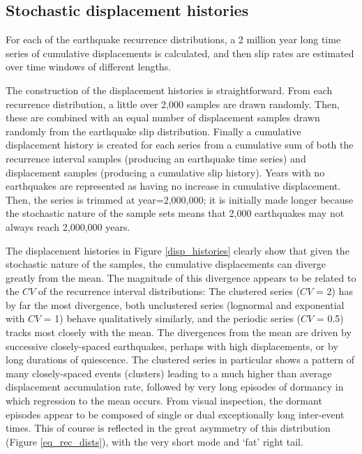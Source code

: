 \documentclass[se, manuscript]{copernicus}
\begin{document}
\subsection{Stochastic displacement
histories}\label{stochastic-displacement-histories}

For each of the earthquake recurrence distributions, a 2 million year
long time series of cumulative displacements is calculated, and then
slip rates are estimated over time windows of different lengths.

The construction of the displacement histories is straightforward. From
each recurrence distribution, a little over 2,000 samples are drawn
randomly. Then, these are combined with an equal number of displacement
samples drawn randomly from the earthquake slip distribution. Finally a
cumulative displacement history is created for each series from a
cumulative sum of both the recurrence interval samples (producing an
earthquake time series) and displacement samples (producing a cumulative
slip history). Years with no earthquakes are represented as having no
increase in cumulative displacement. Then, the series is trimmed at
year=2,000,000; it is initially made longer because the stochastic
nature of the sample sets means that 2,000 earthquakes may not always
reach 2,000,000 years.

The displacement histories in Figure \ref{disp_histories} clearly show
that given the stochastic nature of the samples, the cumulative
displacements can diverge greatly from the mean. The magnitude of this
divergence appears to be related to the \(CV\) of the recurrence
interval distributions: The clustered series (\(CV\) = 2) has by far
the most divergence, both unclustered series (lognormal and exponential
with \(CV\) = 1) behave qualitatively similarly, and the periodic
series (\(CV\) = 0.5) tracks most closely with the mean. The
divergences from the mean are driven by successive closely-spaced
earthquakes, perhaps with high displacements, or by long durations of
quiescence. The clustered series in particular shows a pattern of many
closely-spaced events (clusters) leading to a much higher than average
displacement accumulation rate, followed by very long episodes of
dormancy in which regression to the mean occurs. From visual inspection,
the dormant episodes appear to be composed of single or dual
exceptionally long inter-event times. This of course is reflected in the
great asymmetry of this distribution (Figure \ref{eq_rec_dists}), with
the very short mode and `fat' right tail.
\end{document}
